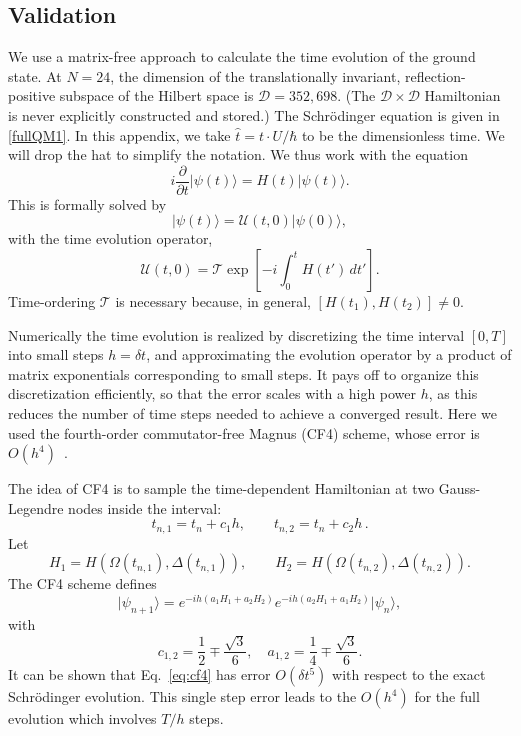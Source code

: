 \documentclass[a4paper,11pt]{article}
\theoremstyle{remark}
\theoremstyle{theorem}
\begin{document}
\subsection{Validation}\label{sec:validation}
We use a matrix-free approach to calculate the time evolution of the ground state.  At $N=24$, the dimension of the translationally invariant, reflection-positive subspace of the Hilbert space is $\mathcal{D}=352{,}698$. (The $\mathcal{D}\times \mathcal{D}$ Hamiltonian is never explicitly constructed and stored.) The Schr\"odinger equation is given in \eqref{fullQM1}. In this appendix, we take $\hat{t} =t\cdot U/\hbar$ to be the dimensionless time. We will drop the hat to simplify the notation. We thus work with the equation
\begin{equation}
i\frac{\partial}{\partial t}\lvert\psi(t)\rangle
=
H(t)\lvert\psi(t)\rangle .\label{eq:Schr11}
\end{equation}
This is formally solved by
\begin{equation}
\lvert\psi(t)\rangle
=
\mathcal{U}(t,0)\lvert\psi(0)\rangle ,
\end{equation}
with the time evolution operator,
\begin{equation}
\mathcal{U}(t,0)
=
\mathcal T
\exp\left[
-i\int_0^t H(t')\,dt'
\right].
\end{equation}
Time-ordering \(\mathcal T\) is necessary because, in general,
$
[H(t_1),H(t_2)]\neq 0.
$

Numerically the time evolution is realized by discretizing the time interval $[0,T]$ into small steps $h=\delta t$, and approximating the evolution operator by a product of matrix exponentials corresponding to small steps. It pays off to organize this discretization efficiently, so that the error scales with a high power $h$, as this reduces the number of time steps needed to achieve a converged result. Here we used the fourth-order commutator-free Magnus (CF4) scheme, whose error is $O(h^4)$~\cite{BlanesMoan2006,AlvermannFehske2011}.

The idea of CF4 is to sample the time-dependent Hamiltonian at two Gauss-Legendre nodes inside the interval:
\begin{equation}
t_{n,1}=t_n+c_1 h,\qquad t_{n,2}=t_n+c_2 h\,.
\end{equation}
Let
\begin{equation}
H_1=H\!\left(\Omega(t_{n,1}),\Delta(t_{n,1})\right),\qquad
H_2=H\!\left(\Omega(t_{n,2}),\Delta(t_{n,2})\right).
\end{equation}
The CF4 scheme defines
\begin{equation}\label{eq:cf4}
 \vert \psi_{n+1}\rangle=
 e^{-i h(a_1 H_1+a_2 H_2)}
 e^{-i h (a_2H_1+a_1H_2)} 
\vert \psi_n\rangle,
\end{equation}
with 
\begin{equation}
c_{1,2}=\frac12\mp\frac{\sqrt3}{6}, \quad
a_{1,2}=\frac14\mp\frac{\sqrt3}{6}.
\end{equation}
It can be shown that Eq.~\eqref{eq:cf4} has error $O(\delta t^5)$ with respect to the exact Schr\"odinger evolution. This single step error leads to the $O(h^4)$ for the full evolution which involves $T/h$ steps.
\end{document}

